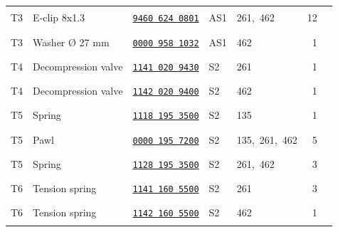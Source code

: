 \documentclass[10pt,letterpaper]{article}
\begin{document}
\begin{longtable}{@{}l>{\raggedright\arraybackslash}p{2.58in}p{1.23in}llrr@{}}
\rowcolor{black!6}T3 & E-clip 8x1.3 & \href{https://rduncangt.github.io/frk-management/parts/94606240801/}{\texttt{9460 624 0801}} & \textcolor{frkSupervision}{AS1} & \textcolor{frkApplication}{\mbox{261, 462}} & 12 & \rule{0.23in}{0.3pt}\\

T3 & Washer \O{} 27 mm & \href{https://rduncangt.github.io/frk-management/parts/00009581032/}{\texttt{0000 958 1032}} & \textcolor{frkSupervision}{AS1} & \textcolor{frkApplication}{\mbox{462}} & 1 & \rule{0.23in}{0.3pt}\\

\rowcolor{black!6}T4 & Decompression valve & \href{https://rduncangt.github.io/frk-management/parts/11410209430/}{\texttt{1141 020 9430}} & \textcolor{frkSupervision}{S2} & \textcolor{frkApplication}{\mbox{261}} & 1 & \rule{0.23in}{0.3pt}\\

T4 & Decompression valve & \href{https://rduncangt.github.io/frk-management/parts/11420209400/}{\texttt{1142 020 9400}} & \textcolor{frkSupervision}{S2} & \textcolor{frkApplication}{\mbox{462}} & 1 & \rule{0.23in}{0.3pt}\\

\rowcolor{black!6}T5 & Spring & \href{https://rduncangt.github.io/frk-management/parts/11181953500/}{\texttt{1118 195 3500}} & \textcolor{frkSupervision}{S2} & \textcolor{frkApplication}{\mbox{135}} & 1 & \rule{0.23in}{0.3pt}\\

T5 & Pawl & \href{https://rduncangt.github.io/frk-management/parts/00001957200/}{\texttt{0000 195 7200}} & \textcolor{frkSupervision}{S2} & \textcolor{frkApplication}{\mbox{135, 261, 462}} & 5 & \rule{0.23in}{0.3pt}\\

\rowcolor{black!6}T5 & Spring & \href{https://rduncangt.github.io/frk-management/parts/11281953500/}{\texttt{1128 195 3500}} & \textcolor{frkSupervision}{S2} & \textcolor{frkApplication}{\mbox{261, 462}} & 3 & \rule{0.23in}{0.3pt}\\

T6 & Tension spring & \href{https://rduncangt.github.io/frk-management/parts/11411605500/}{\texttt{1141 160 5500}} & \textcolor{frkSupervision}{S2} & \textcolor{frkApplication}{\mbox{261}} & 3 & \rule{0.23in}{0.3pt}\\

\rowcolor{black!6}T6 & Tension spring & \href{https://rduncangt.github.io/frk-management/parts/11421605500/}{\texttt{1142 160 5500}} & \textcolor{frkSupervision}{S2} & \textcolor{frkApplication}{\mbox{462}} & 1 & \rule{0.23in}{0.3pt}\\


\end{longtable}
\end{document}
